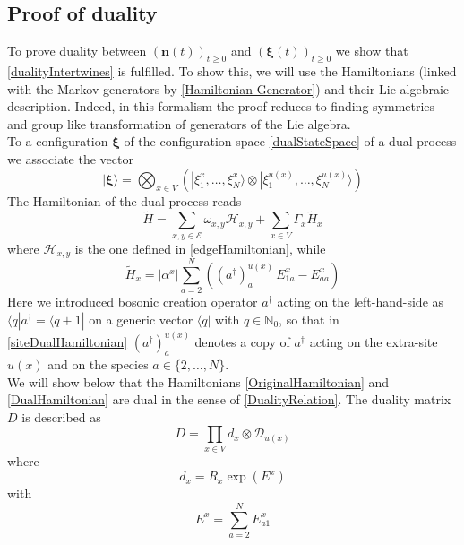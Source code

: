 \documentclass[10pt]{article}
\numberwithin{equation}{section}
\numberwithin{equation}{subsection}
\newcommand{\dd}{\mathcal{D}_{u(x)}}
\begin{document}
\subsection{Proof of duality}
To prove duality between $(\bm{n}(t))_{t\geq 0}$ and $(\bm{\xi}(t))_{t\geq 0}$ we  show that \eqref{dualityIntertwines} is fulfilled.  To show this, we will use the Hamiltonians (linked with the Markov generators by \eqref{Hamiltonian-Generator}) and their Lie algebraic description. Indeed, in this formalism the proof reduces to finding symmetries and group like transformation of generators of the Lie algebra.\\
To a configuration $\bm{\xi}$ of the configuration space  \eqref{dualStateSpace} of a dual process we associate the vector
\begin{equation}
    |\bm{\xi}\rangle=\bigotimes_{x\in V}\left(|\xi_{1}^{x},\ldots,\xi_{N}^{x}\rangle\otimes |\xi_{1}^{u(x)},\ldots,\xi_{N}^{u(x)}\rangle\right)
\end{equation}
The Hamiltonian of the dual process reads
\begin{equation}\label{DualHamiltonian}
    \widetilde{H}=\sum_{x,y\in \mathcal{E}}\omega_{x,y}\mathcal{H}_{x,y}+\sum_{x\in V}\Gamma_{x}\widetilde{H}_{x}
\end{equation}
where $\mathcal{H}_{x,y}$ is the one defined in \eqref{edgeHamiltonian}, while 
\begin{equation}\label{siteDualHamiltonian}
    \widetilde{H}_{x}=|\alpha^{x}|\sum_{a=2}^{N}\left((a^{\dagger})_{a}^{u(x)}\,E_{1a}^{x}-E_{aa}^{x}\right)
\end{equation}
Here we introduced bosonic creation operator $a^{\dagger}$ acting on the left-hand-side as $\langle q|a^{\dagger}=\langle q+1|$ on a generic vector $\langle q|$ with $q\in \mathbb{N}_{0}$, so that in \eqref{siteDualHamiltonian} 
$(a^{\dagger})_{a}^{u(x)}$ denotes a copy of $a^{\dagger}$ acting on the extra-site $u(x)$ and on the species $a\in\{2,\ldots,N\}$. \\
We will show below that the Hamiltonians \eqref{OriginalHamiltonian} and \eqref{DualHamiltonian} are dual in the sense of \eqref{DualityRelation}. The duality matrix $D$ is described as 
\begin{equation}\label{dualityMatrix}
    D=\prod_{x\in V}d_{x}\otimes \dd
\end{equation}
where
\begin{equation}\label{bulkElementDualityMatrix}
d_{x}=R_{x}\exp{(E^{x})}
\end{equation}
with 
\begin{equation}\label{EquationEx}
E^{x}=\sum_{a=2}^{N}E_{a1}^{x}
\end{equation}
\end{document}
